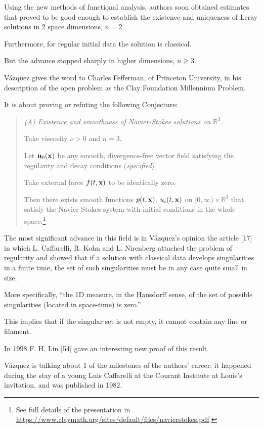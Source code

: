 \documentclass{article}
\begin{document}
Using the new methods of functional analysis, authors soon obtained estimates that proved to be good enough to establish the existence and uniqueness of Leray solutions in 2 space dimensions, $n = 2$.

Furthermore, for regular initial data the solution is classical.

But the advance stopped sharply in higher dimensions, $n\ge 3$.

V\'azquez gives the word to Charles Fefferman, of Princeton University, in his description of the open problem as the Clay Foundation Millennium Problem.

It is about proving or refuting the following Conjecture:
\begin{quotation}\it
	(A) Existence and smoothness of Navier-Stokes solutions on $\mathbb{R}^3$.
	
	Take viscosity $\nu > 0$ and $n = 3$.
	
	Let ${\bf u}_0({\bf x})$ be any smooth, divergence-free vector field satisfying the regularity and decay conditions (\emph{specified}).
	
	Take external force $f(t,{\bf x})$ to be identically zero.
	
	Then there exists smooth functions $p(t,{\bf x})$, $u_i(t,{\bf x})$ on $[0,\infty)\times\mathbb{R}^3$ that satisfy the Navier-Stokes system with initial conditions in the whole space.\footnote{See full details of the presentation in \url{https://www.claymath.org/sites/default/files/navierstokes.pdf}.}
\end{quotation}
The most significant advance in this field is in V\'azquez's opinion the article [17] in which L. Caffarelli, R. Kohn and L. Nirenberg attached the problem of regularity and showed that if a solution with classical data develops singularities in a finite time, the set of such singularities must be in any case quite small in size.

More specifically, ``the 1D measure, in the Hausdorff sense, of the set of possible singularities (located in space-time) is zero.''

This implies that if the singular set is not empty, it cannot contain any line or filament.

In 1998 F. H. Lin [54] gave an interesting new proof of this result.

%
V\'azquez is talking about 1 of the milestones of the authors' career; it happened during the stay of a young Luis Caffarelli at the Courant Institute at Louis's invitation, and was published in 1982.
\end{document}

